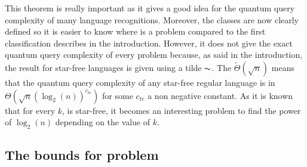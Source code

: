 This theorem is really important as it gives a good idea for the quantum
query complexity of many language recognitions. Moreover, the classes are
now clearly defined so it is easier to know where is a problem compared
to the first classification describes in the introduction. However, it
does not give the exact quantum query complexity of every problem because,
as said in the introduction, the result for star-free languages is given
using a tilde $\thicksim $. The $\tilde{\Theta}(\sqrt{n})$ means that the
quantum query complexity of any star-free regular language is in
$\Theta(\sqrt{n}(\log_2(n))^{c_{te}})$ for some ${c_{te}}$ a non
negative constant. As it is known that for every $k$,  is star-free\cite{dyck_height_bound_star_free},
it becomes an interesting problem to find the power of $\log_2(n)$ depending
on the value of $k$.

\subsection{The bounds for  problem}

